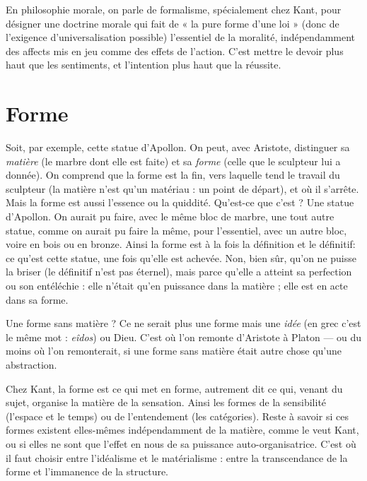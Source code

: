 En philosophie morale, on parle de formalisme, spécialement chez Kant,
pour désigner une doctrine morale qui fait de « la pure forme d’une loi » (donc
de l’exigence d’universalisation possible) l'essentiel de la moralité, indépendamment
des affects mis en jeu comme des effets de l’action. C’est mettre le devoir
plus haut que les sentiments, et l’intention plus haut que la réussite.

\section{Forme}
Soit, par exemple, cette statue d’Apollon. On peut, avec Aristote,
distinguer sa {\it matière} (le marbre dont elle est faite) et sa {\it forme} (celle
que le sculpteur lui a donnée). On comprend que la forme est la fin, vers
laquelle tend le travail du sculpteur (la matière n’est qu’un matériau : un point
de départ), et où il s’arrête. Mais la forme est aussi l’essence ou la quiddité.
Qu'est-ce que c’est ? Une statue d’Apollon. On aurait pu faire, avec le même
bloc de marbre, une tout autre statue, comme on aurait pu faire la même, pour
l'essentiel, avec un autre bloc, voire en bois ou en bronze. Ainsi la forme est à
la fois la définition et le définitif: ce qu’est cette statue, une fois qu’elle est
achevée. Non, bien sûr, qu’on ne puisse la briser (le définitif n’est pas éternel),
mais parce qu’elle a atteint sa perfection ou son entéléchie : elle n’était qu’en
puissance dans la matière ; elle est en acte dans sa forme.

Une forme sans matière ? Ce ne serait plus une forme mais une {\it idée} (en grec
c’est le même mot : {\it eîdos}) ou Dieu. C’est où l’on remonte d’Aristote à Platon —
ou du moins où l’on remonterait, si une forme sans matière était autre chose
qu’une abstraction.

Chez Kant, la forme est ce qui met en forme, autrement dit ce qui, venant
du sujet, organise la matière de la sensation. Ainsi les formes de la sensibilité
(l'espace et le temps) ou de l’entendement (les catégories). Reste à savoir si ces
formes existent elles-mêmes indépendamment de la matière, comme le veut
Kant, ou si elles ne sont que l’effet en nous de sa puissance auto-organisatrice.
C’est où il faut choisir entre l’idéalisme et le matérialisme : entre la transcendance
de la forme et l’immanence de la structure.

